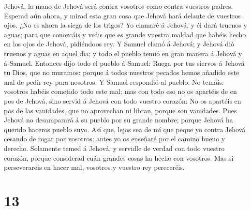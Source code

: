 Jehová, la mano de Jehová será contra vosotros como contra vuestros
padres.  Esperad aún ahora, y mirad esta gran cosa que
Jehová hará delante de vuestros ojos.  ¿No es ahora la
siega de los trigos? Yo clamaré á Jehová, y él dará truenos y aguas;
para que conozcáis y veáis que es grande vuestra maldad que habéis hecho
en los ojos de Jehová, pidiéndoos rey.  Y Samuel clamó á
Jehová; y Jehová dió truenos y aguas en aquel día; y todo el pueblo
temió en gran manera á Jehová y á Samuel.  Entonces dijo
todo el pueblo á Samuel: Ruega por tus siervos á Jehová tu Dios, que no
muramos: porque á todos nuestros pecados hemos añadido este mal de pedir
rey para nosotros.  Y Samuel respondió al pueblo: No
temáis: vosotros habéis cometido todo este mal; mas con todo eso no os
apartéis de en pos de Jehová, sino servid á Jehová con todo vuestro
corazón:  No os apartéis en pos de las vanidades, que no
aprovechan ni libran, porque son vanidades.  Pues Jehová no
desamparará á su pueblo por su grande nombre; porque Jehová ha querido
haceros pueblo suyo.  Así que, lejos sea de mí que peque yo
contra Jehová cesando de rogar por vosotros; antes yo os enseñaré por el
camino bueno y derecho.  Solamente temed á Jehová, y
servidle de verdad con todo vuestro corazón, porque considerad cuán
grandes cosas ha hecho con vosotros.  Mas si perseverareis
en hacer mal, vosotros y vuestro rey pereceréis.

\hypertarget{section-12}{%
\section{13}\label{section-12}}

